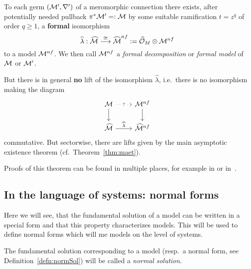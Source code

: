 \begin{thm}\label{thm:leveltTurittin}
  To each germ $(\mathcal{M}',\nabla')$ of a meromorphic connection there exists, after
  potentially needed pullback $\pi^{*}\textcolor{black}{\mathcal{M}'}=:\mathcal{M}$ by some
  suitable ramification $t=z^q$ of order $q\geq1$, a \textbf{formal} isomorphism
  \[
    \widehat{\lambda}:\widehat{\mathcal{M}}\overset{\cong}\longrightarrow
    \widehat{\textcolor{black}{\mathcal{M}}}^{nf}:=\widehat{\mathcal{O}}_M\otimes\mathcal{M}^{nf}
  \]
  to a model $\mathcal{M}^{nf}$.
  We then call $\mathcal{M}^{nf}$ a \emph{formal decomposition} or \emph{formal model}
  of $\mathcal{M}$ or $\mathcal{M}'$.
  \begin{s-rem}\label{rem:leveltTurittin}
    But there is in general \textbf{no} lift of the isomorphism $\hat\lambda$,
    i.e.\ there is no isomorphism making the diagram
    \[ \begin{tikzcd}
        \cM \dar \arrow[dotted]{r}[description]{?} & \cM^{nf} \dar
        \\\hat\cM \rar{\hat\lambda} & \hat\cM^{nf}
    \end{tikzcd} \]
    commutative.
    But sectorwise, there are lifts given by the main asymptotic existence
    theorem (cf.\ Theorem~\ref{thm:maet}).
  \end{s-rem}
\end{thm}
Proofs of this theorem can be found in multiple places, for example in
\cite[Thm.5.4.7]{sabbah_cimpa90} or in~\cite{myBa}.

\subsection{In the language of systems: normal forms}\label{sec:normalForms}
Here we will see, that the fundamental solution of a model can be written in a
special form and that this property characterizes models. This will be used to
define normal forms which will me models on the level of systems.
\begin{defn}
  The fundamental solution corresponding to a model (resp.\ a normal form, see
  Definition~\ref{defn:normSol}) will be called a
  \emph{normal solution}.
\end{defn}

